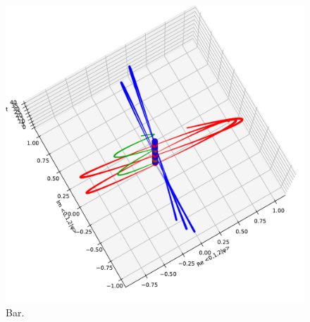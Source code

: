 \begin{figure}
  \includegraphics[width=\textwidth]{img/3ldetect/hermitianSpaceTime_top.pdf}
  \caption{Bar.}
\end{figure}

